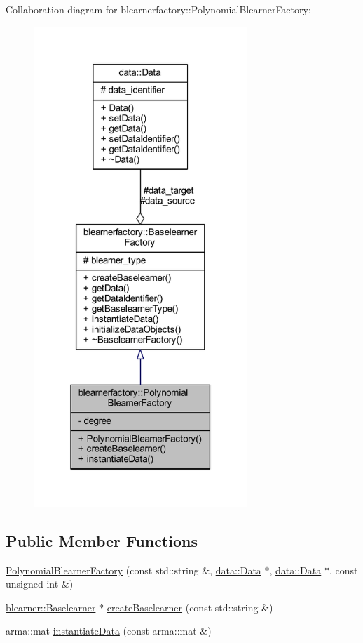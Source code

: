 Collaboration diagram for blearnerfactory\+:\+:Polynomial\+Blearner\+Factory\+:\nopagebreak
\begin{figure}[H]
\begin{center}
\leavevmode
\includegraphics[width=229pt]{classblearnerfactory_1_1_polynomial_blearner_factory__coll__graph}
\end{center}
\end{figure}
\subsection*{Public Member Functions}
\begin{DoxyCompactItemize}
\item 
\mbox{\hyperlink{classblearnerfactory_1_1_polynomial_blearner_factory_a87a3247a9abe49009e1e951f25ed97cf}{Polynomial\+Blearner\+Factory}} (const std\+::string \&, \mbox{\hyperlink{classdata_1_1_data}{data\+::\+Data}} $\ast$, \mbox{\hyperlink{classdata_1_1_data}{data\+::\+Data}} $\ast$, const unsigned int \&)
\item 
\mbox{\hyperlink{classblearner_1_1_baselearner}{blearner\+::\+Baselearner}} $\ast$ \mbox{\hyperlink{classblearnerfactory_1_1_polynomial_blearner_factory_ac0c7f742da0a2de444e91a0cfb0a9384}{create\+Baselearner}} (const std\+::string \&)
\item 
arma\+::mat \mbox{\hyperlink{classblearnerfactory_1_1_polynomial_blearner_factory_aeea9c480671ae7cf7d3be470ce0feaef}{instantiate\+Data}} (const arma\+::mat \&)
\end{DoxyCompactItemize}
